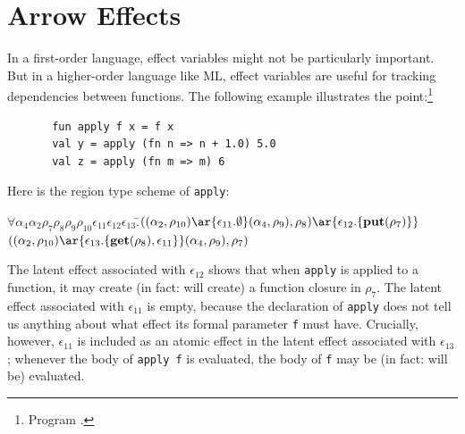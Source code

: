 \documentclass[12pt]{book}
\begin{document}
\section{Arrow Effects}
In a first-order language, effect variables might not be particularly important.
But in a higher-order language like ML, effect variables are useful for tracking
dependencies between functions. The following example illustrates the point:\footnote{Program .}
\begin{verbatim}
       fun apply f x = f x
       val y = apply (fn n => n + 1.0) 5.0
       val z = apply (fn m => m) 6
\end{verbatim}
Here is the region type scheme of {\tt apply}:
\begin{tabbing}
\qquad$\forall\alpha_4\alpha_2\rho_7\rho_8\rho_9\rho_{10}\epsilon_{11}\epsilon_{12}\epsilon_{13}.$\=$((\alpha_2,\rho_{10})
        \ar{\epsilon_{11}.\emptyset}(\alpha_4,\rho_9),\rho_8)\ar{\epsilon_{12}.\{\Put(\rho_7)\}}$\\
            \>$((\alpha_2,\rho_{10})\ar{\epsilon_{13}.\{\Get(\rho_8), \epsilon_{11}\}}(\alpha_4,\rho_9),\rho_7)$
\end{tabbing}
The latent effect associated with $\epsilon_{12}$ shows that when {\tt apply} is applied to a function,
it may create (in fact: will create) a function closure in $\rho_7$.  The latent effect associated with
$\epsilon_{11}$ is empty, because the declaration of {\tt apply} does not tell us anything about what effect
its formal parameter {\tt f} must have. Crucially, however, $\epsilon_{11}$ is included as an atomic effect
in the latent effect associated with $\epsilon_{13}$; whenever the body of {\tt apply f} is evaluated, the
body of {\tt f} may be (in fact: will be) evaluated.
\end{document}
